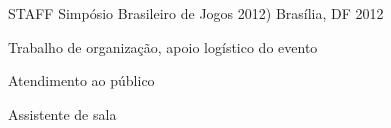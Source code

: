 \begin{cventries}
  \cventry
    {STAFF} %
    {Simpósio Brasileiro de Jogos 2012)} %
    {Brasília, DF} %
    {2012} %
    {
      \begin{cvitems} %
        \item {Trabalho de organização, apoio logístico do evento}
       	\item {Atendimento ao público}
       	\item {Assistente de sala}
      \end{cvitems}
    }

\end{cventries}
